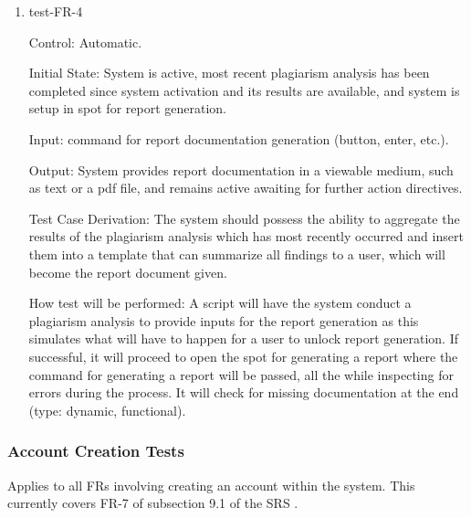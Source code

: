 \documentclass[12pt, titlepage]{article}
\begin{document}
\begin{enumerate}

\item{test-FR-4\\}

Control: Automatic.
					
Initial State: System is active, most recent plagiarism analysis has been 
completed since system activation and its results are available, and system 
is setup in spot for report generation.
					
Input: command for report documentation generation (button, enter, etc.).
					
Output: System provides report documentation in a viewable medium, such
as text or a pdf file, and remains active awaiting for further action 
directives.

Test Case Derivation: The system should possess the ability to aggregate
the results of the plagiarism analysis which has most recently occurred 
and insert them into a template that can summarize all findings to a user,
which will become the report document given.

How test will be performed: A script will have the system conduct a 
plagiarism analysis to provide inputs for the report generation as this
simulates what will have to happen for a user to unlock report generation. 
If successful, it will proceed to open the spot for generating a report 
where the command for generating a report will be passed, all the while 
inspecting for errors during the process. It will check for missing 
documentation at the end (type: dynamic, functional).			

\end{enumerate}

\subsubsection{Account Creation Tests}

Applies to all FRs involving creating an account within the system. This currently
covers FR-7 of subsection 9.1 of the SRS \citep{SRS}.
\end{document}
